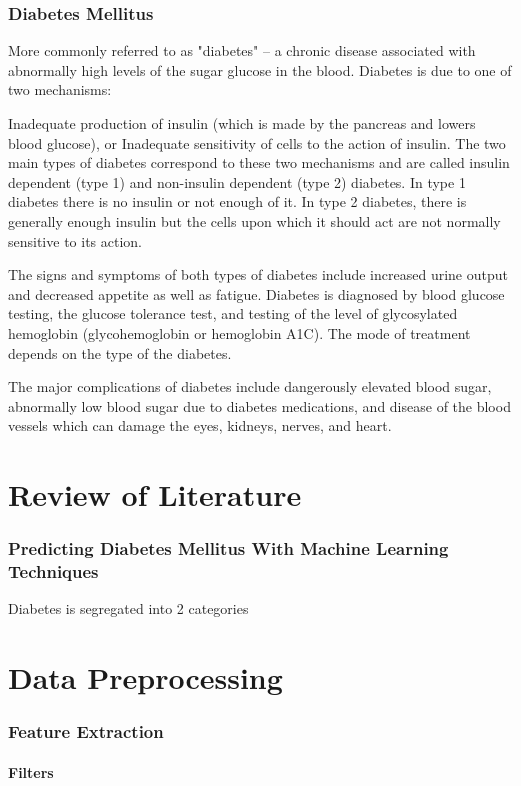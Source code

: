 \documentclass[12pt]{article}
\begin{document}
\newpage
\section{Diabetes Mellitus}
More commonly referred to as "diabetes" -- a chronic disease associated with abnormally high levels of the sugar glucose in the blood. Diabetes is due to one of two mechanisms:

Inadequate production of insulin (which is made by the pancreas and lowers blood glucose), or
Inadequate sensitivity of cells to the action of insulin.
The two main types of diabetes correspond to these two mechanisms and are called insulin dependent (type 1) and non-insulin dependent (type 2) diabetes. In type 1 diabetes there is no insulin or not enough of it. In type 2 diabetes, there is generally enough insulin but the cells upon which it should act are not normally sensitive to its action.

The signs and symptoms of both types of diabetes include increased urine output and decreased appetite as well as fatigue. Diabetes is diagnosed by blood glucose testing, the glucose tolerance test, and testing of the level of glycosylated hemoglobin (glycohemoglobin or hemoglobin A1C). The mode of treatment depends on the type of the diabetes.

The major complications of diabetes include dangerously elevated blood sugar, abnormally low blood sugar due to diabetes medications, and disease of the blood vessels which can damage the eyes, kidneys, nerves, and heart.

\newpage
\part{Review of Literature}
\section{Predicting Diabetes Mellitus With Machine Learning Techniques}
Diabetes is segregated into 2 categories 
\newpage
\part{Data Preprocessing}
\section{Feature Extraction}
\subsection{Filters}
\end{document}
